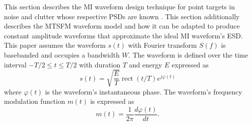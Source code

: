 \documentclass{article}
\DeclareMathOperator{\rect}{rect}
\begin{document}
This section describes the MI waveform design technique for point targets in noise and clutter whose respective PSDs are known \cite{Kay2007}.  This section additionally describes the MTSFM waveform model and how it can be adapted to produce constant amplitude waveforms that approximate the ideal MI waveform's ESD.  This paper assumes the waveform $s\left(t\right)$ with Fourier transform $S\left(f\right)$ is basebanded and occupies a bandwidth $W$.  The waveform is defined over the time interval $-T/2 \leq t \leq T/2$ with duration $T$ and energy $E$ expressed as 
\begin{equation}
s\left(t\right) = \sqrt{\dfrac{E}{T}}\rect\left(t/T\right)e^{j\varphi\left(t\right)}
\label{eq:complexExpo}
\end{equation}
where $\varphi\left(t\right)$ is the waveform's instantaneous phase.  The waveform's frequency modulation function $m\left(t\right)$ is expressed as 
\begin{equation}
m\left(t\right) = \dfrac{1}{2\pi}\dfrac{d\varphi\left(t\right)}{dt}.
\label{eq:mod}
\end{equation}
\end{document}
